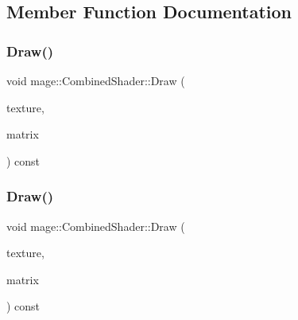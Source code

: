 \subsection{Member Function Documentation}
\hypertarget{structmage_1_1_combined_shader_a46cc51271ab3676ab57452037f367a93}{}\label{structmage_1_1_combined_shader_a46cc51271ab3676ab57452037f367a93} 
\subsubsection{\texorpdfstring{Draw()}{Draw()}\hspace{0.1cm}{\footnotesize\ttfamily [1/3]}}
{\footnotesize\ttfamily void mage\+::\+Combined\+Shader\+::\+Draw (\begin{DoxyParamCaption}\item[{const \hyperlink{classmage_1_1_texture}{Texture} \&}]{texture,  }\item[{const X\+M\+M\+A\+T\+R\+IX \&}]{matrix }\end{DoxyParamCaption}) const}

\hypertarget{structmage_1_1_combined_shader_ad1fba7349714e62c7b1215b8928fddd3}{}\label{structmage_1_1_combined_shader_ad1fba7349714e62c7b1215b8928fddd3} 
\subsubsection{\texorpdfstring{Draw()}{Draw()}\hspace{0.1cm}{\footnotesize\ttfamily [2/3]}}
{\footnotesize\ttfamily void mage\+::\+Combined\+Shader\+::\+Draw (\begin{DoxyParamCaption}\item[{I\+D3\+D11\+Shader\+Resource\+View $\ast$const $\ast$}]{texture,  }\item[{const X\+M\+M\+A\+T\+R\+IX \&}]{matrix }\end{DoxyParamCaption}) const}

\hypertarget{structmage_1_1_combined_shader_a9495f851c713c2d43c2eecf5aced3d9f}{}\label{structmage_1_1_combined_shader_a9495f851c713c2d43c2eecf5aced3d9f} 
